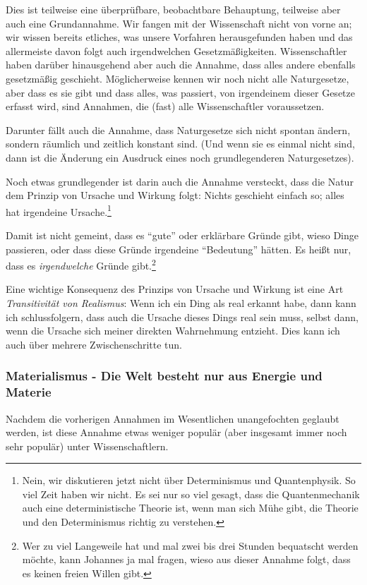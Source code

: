 Dies ist teilweise eine überprüfbare, beobachtbare Behauptung, teilweise aber auch eine Grundannahme. Wir fangen mit
der Wissenschaft nicht von vorne an; wir wissen bereits etliches, was unsere Vorfahren herausgefunden haben und das
allermeiste davon folgt auch irgendwelchen Gesetzmäßigkeiten. Wissenschaftler haben darüber hinausgehend aber auch
die Annahme, dass alles andere ebenfalls gesetzmäßig geschieht. Möglicherweise kennen wir noch nicht alle
Naturgesetze, aber dass es sie gibt und dass alles, was passiert, von irgendeinem dieser Gesetze erfasst wird, sind
Annahmen, die (fast) alle Wissenschaftler voraussetzen.

Darunter fällt auch die Annahme, dass Naturgesetze sich nicht spontan ändern, sondern räumlich und zeitlich konstant sind. (Und
wenn sie es einmal nicht sind, dann ist die Änderung ein Ausdruck eines noch grundlegenderen Naturgesetzes).

Noch etwas grundlegender ist darin auch die Annahme versteckt, dass die Natur dem Prinzip von Ursache und Wirkung folgt:
Nichts geschieht einfach so; alles hat irgendeine Ursache.\footnote{Nein,
    wir diskutieren jetzt nicht über Determinismus und Quantenphysik. So viel Zeit haben wir nicht. Es sei nur so viel
    gesagt, dass die Quantenmechanik auch eine deterministische Theorie ist, wenn man sich Mühe gibt,
    die Theorie und den Determinismus richtig zu verstehen.}

Damit ist nicht gemeint, dass es \enquote{gute}
oder erklärbare Gründe gibt, wieso Dinge passieren, oder dass diese Gründe irgendeine \enquote{Bedeutung}
hätten. Es heißt nur, dass es \emph{irgendwelche} Gründe gibt.\footnote{Wer zu viel Langeweile hat und mal zwei bis drei Stunden bequatscht werden möchte, kann Johannes ja mal fragen, wieso aus dieser Annahme folgt, dass es keinen freien Willen gibt.}

Eine wichtige Konsequenz des Prinzips von Ursache und Wirkung ist eine Art \emph{Transitivität von Realismus}: Wenn ich ein Ding als real erkannt habe, dann kann ich schlussfolgern, dass auch die Ursache dieses Dings real sein muss, selbst dann, wenn die Ursache sich meiner direkten Wahrnehmung entzieht. Dies kann ich auch über mehrere Zwischenschritte tun.

\subsubsection{Materialismus - Die Welt besteht nur aus Energie und Materie}

Nachdem die vorherigen Annahmen im Wesentlichen unangefochten geglaubt werden, ist diese Annahme etwas weniger populär
(aber insgesamt immer noch sehr populär) unter Wissenschaftlern.

